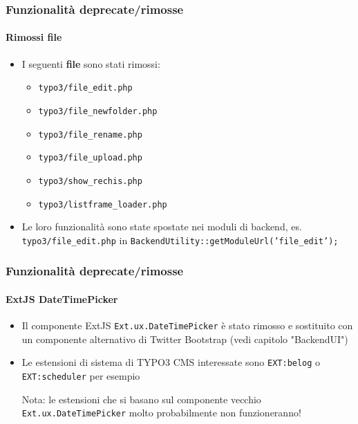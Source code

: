 \begin{frame}[fragile]
	\frametitle{Funzionalità deprecate/rimosse}
	\framesubtitle{Rimossi file}

	\begin{itemize}
		\item I seguenti \textbf{file} sono stati rimossi:

			\begin{itemize}
				\item \texttt{typo3/file\_edit.php}
				\item \texttt{typo3/file\_newfolder.php}
				\item \texttt{typo3/file\_rename.php}
				\item \texttt{typo3/file\_upload.php}
				\item \texttt{typo3/show\_rechis.php}
				\item \texttt{typo3/listframe\_loader.php}
			\end{itemize}

		\item Le loro funzionalità sono state spostate nei moduli di backend,
			es. \texttt{typo3/file\_edit.php} in \texttt{BackendUtility::getModuleUrl('file\_edit');}

	\end{itemize}

\end{frame}


\begin{frame}[fragile]
	\frametitle{Funzionalità deprecate/rimosse}
	\framesubtitle{ExtJS DateTimePicker}

	\begin{itemize}

		\item Il componente ExtJS \texttt{Ext.ux.DateTimePicker} è stato rimosso e sostituito
			con un componente alternativo di Twitter Bootstrap (vedi capitolo "BackendUI")

		\item Le estensioni di sistema di TYPO3 CMS interessate sono \texttt{EXT:belog} o
			\texttt{EXT:scheduler} per esempio

			\vspace{0.2cm}

			\begingroup
				\color{red}
					Nota: le estensioni che si basano sul componente vecchio
					\texttt{Ext.ux.DateTimePicker} molto probabilmente non funzioneranno!
			\endgroup

	\end{itemize}

\end{frame}

